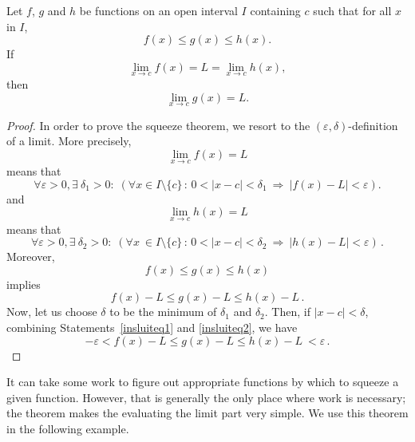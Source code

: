 \begin{theorem}\label{thm:sqz}
Let $f$, $g$ and $h$ be functions on an open interval $I$ containing $c$ such that for all $x$ in $I$, 
$$f(x)\leq g(x) \leq h(x).$$ 
If 
$$\lim_{x\to c} f(x) = L = \lim_{x\to c} h(x),$$
 then $$\lim_{x\to c} g(x) = L.$$ 
\end{theorem}



\ifanalysis

\begin{proof}
In order to prove the squeeze theorem, we resort to the $(\varepsilon, \delta)$-definition of a limit. More precisely, 
$$
\displaystyle \lim _{x\to c}f(x)=L
$$
means that
\begin{equation}
\displaystyle \forall \varepsilon >0,\exists \ \delta _{1}>0:\;\left(\forall x\in I\setminus\{c\}\,:\, 0<|x-c|<\delta _{1}\ \Rightarrow \ |f(x)-L|<\varepsilon \right).
\label{insluiteq1}
\end{equation}
and
$$
\displaystyle \lim _{x\to c}h(x)=L
$$
means that
\begin{equation}
\displaystyle \forall \varepsilon >0,\exists \ \delta _{2}>0:\;\left(\forall x\ \in I\setminus\{c\}\,:\,0<|x-c|<\delta _{2}\ \Rightarrow \ |h(x)-L|<\varepsilon \right)\,.
\label{insluiteq2}
\end{equation}
Moreover, 
$$
\displaystyle f(x)\leq g(x)\leq h(x)
$$
implies 
$$
\displaystyle f(x)-L\leq g(x)-L\leq h(x)-L\,.
$$
Now, let us choose $\delta$ to be the minimum of $\delta_1$ and $\delta_2$. Then, if $\displaystyle |x-c|<\delta$, combining Statements~\eqref{insluiteq1} and \eqref{insluiteq2}, we have
$$
 -\varepsilon <f(x)-L\leq g(x)-L\leq h(x)-L\ <\varepsilon\,.
$$\phantom{}
\end{proof}

\fi

It can take some work to figure out appropriate functions by which to squeeze a given function. However, that is generally the only place where work is necessary; the theorem makes the evaluating the limit part very simple. We use this theorem in the following example.


